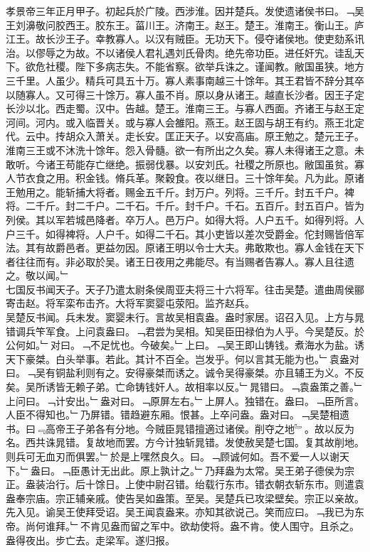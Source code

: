 \documentclass{zhvt-classic}
\begin{document}
\hspace*{2em}孝景帝三年正月甲子。初起兵於广陵。西涉淮。因并楚兵。发使遗诸侯书曰。﹁吴王刘濞敬问胶西王。胶东王。菑川王。济南王。赵王。楚王。淮南王。衡山王。庐江王。故长沙王子。幸教寡人。以汉有贼臣。无功天下。侵夺诸侯地。使吏劾系讯治。以僇辱之为故。不以诸侯人君礼遇刘氏骨肉。绝先帝功臣。进任奸宄。诖乱天下。欲危社稷。陛下多病志失。不能省察。欲举兵诛之。谨闻教。敝国虽狭。地方三千里。人虽少。精兵可具五十万。寡人素事南越三十馀年。其王君皆不辞分其卒以随寡人。又可得三十馀万。寡人虽不肖。原以身从诸王。越直长沙者。因王子定长沙以北。西走蜀。汉中。告越。楚王。淮南三王。与寡人西面。齐诸王与赵王定河间。河内。或入临晋关。或与寡人会雒阳。燕王。赵王固与胡王有约。燕王北定代。云中。抟胡众入萧关。走长安。匡正天子。以安高庙。原王勉之。楚元王子。淮南三王或不沐洗十馀年。怨入骨髓。欲一有所出之久矣。寡人未得诸王之意。未敢听。今诸王苟能存亡继绝。振弱伐暴。以安刘氏。社稷之所原也。敝国虽贫。寡人节衣食之用。积金钱。脩兵革。聚穀食。夜以继日。三十馀年矣。凡为此。原诸王勉用之。能斩捕大将者。赐金五千斤。封万户。列将。三千斤。封五千户。裨将。二千斤。封二千户。二千石。千斤。封千户。千石。五百斤。封五百户。皆为列侯。其以军若城邑降者。卒万人。邑万户。如得大将。人户五千。如得列将。人户三千。如得裨将。人户千。如得二千石。其小吏皆以差次受爵金。佗封赐皆倍军法。其有故爵邑者。更益勿因。原诸王明以令士大夫。弗敢欺也。寡人金钱在天下者往往而有。非必取於吴。诸王日夜用之弗能尽。有当赐者告寡人。寡人且往遗之。敬以闻。﹂\\
\hspace*{2em}七国反书闻天子。天子乃遣太尉条侯周亚夫将三十六将军。往击吴楚。遣曲周侯郦寄击赵。将军栾布击齐。大将军窦婴屯荥阳。监齐赵兵。\\
\hspace*{2em}吴楚反书闻。兵未发。窦婴未行。言故吴相袁盎。盎时家居。诏召入见。上方与晁错调兵笇军食。上问袁盎曰。﹁君尝为吴相。知吴臣田禄伯为人乎。今吴楚反。於公何如。﹂对曰。﹁不足忧也。今破矣。﹂上曰。﹁吴王即山铸钱。煮海水为盐。诱天下豪桀。白头举事。若此。其计不百全。岂发乎。何以言其无能为也。﹂袁盎对曰。﹁吴有铜盐利则有之。安得豪桀而诱之。诚令吴得豪桀。亦且辅王为义。不反矣。吴所诱皆无赖子弟。亡命铸钱奸人。故相率以反。﹂晁错曰。﹁袁盎策之善。﹂上问曰。﹁计安出。﹂盎对曰。﹁原屏左右。﹂上屏人。独错在。盎曰。﹁臣所言。人臣不得知也。﹂乃屏错。错趋避东厢。恨甚。上卒问盎。盎对曰。﹁吴楚相遗书。曰﹃高帝王子弟各有分地。今贼臣晁错擅適过诸侯。削夺之地﹄。故以反为名。西共诛晁错。复故地而罢。方今计独斩晁错。发使赦吴楚七国。复其故削地。则兵可无血刃而俱罢。﹂於是上嘿然良久。曰。﹁顾诚何如。吾不爱一人以谢天下。﹂盎曰。﹁臣愚计无出此。原上孰计之。﹂乃拜盎为太常。吴王弟子德侯为宗正。盎装治行。后十馀日。上使中尉召错。绐载行东市。错衣朝衣斩东市。则遣袁盎奉宗庙。宗正辅亲戚。使告吴如盎策。至吴。吴楚兵已攻梁壁矣。宗正以亲故。先入见。谕吴王使拜受诏。吴王闻袁盎来。亦知其欲说己。笑而应曰。﹁我已为东帝。尚何谁拜。﹂不肯见盎而留之军中。欲劫使将。盎不肯。使人围守。且杀之。盎得夜出。步亡去。走梁军。遂归报。\\
\end{document}
